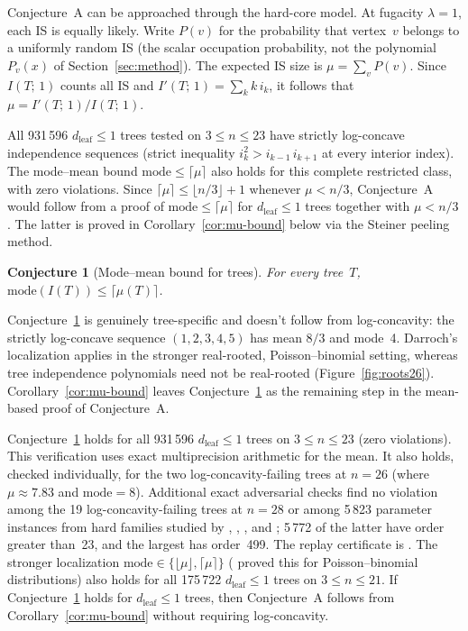 \documentclass[12pt,oneside]{article}
\newtheorem{conjecture}[theorem]{Conjecture}
\theoremstyle{remark}
\newcommand{\dleaf}{d_{\mathrm{leaf}}}    %
\begin{document}
Conjecture~A can be approached through the hard-core model.
At fugacity $\lambda = 1$, each IS is equally likely.
Write $P(v)$ for the probability that vertex~$v$ belongs to a uniformly random IS (the scalar occupation probability, not the polynomial~$P_v(x)$ of Section~\ref{sec:method}).
The expected IS size is $\mu = \sum_v P(v)$.
Since $I(T;\, 1)$ counts all IS and $I'(T;\, 1) = \sum_k k\, i_k$, it follows that $\mu = I'(T;\, 1) / I(T;\, 1)$.

All 931\,596 $\dleaf \le 1$ trees tested on $3\le n\le23$ have strictly log-concave independence sequences (strict inequality $i_k^2 > i_{k-1}\, i_{k+1}$ at every interior index).
The mode--mean bound $\mathrm{mode} \le \lceil\mu\rceil$ also holds for this complete restricted class, with zero violations.
Since $\lceil \mu \rceil \le \lfloor n/3 \rfloor + 1$ whenever $\mu < n/3$, Conjecture~A would follow from a proof of $\mathrm{mode} \le \lceil\mu\rceil$ for $\dleaf \le 1$ trees together with $\mu < n/3$.
The latter is proved in Corollary~\ref{cor:mu-bound} below via the Steiner peeling method.

\begin{conjecture}[Mode--mean bound for trees]\label{conj:mode-mean}
  For every tree~$T$, $\mathrm{mode}(I(T)) \le \lceil \mu(T) \rceil$.
\end{conjecture}

Conjecture~\ref{conj:mode-mean} is genuinely tree-specific and doesn't follow from log-concavity: the strictly log-concave sequence $(1,2,3,4,5)$ has mean $8/3$ and mode~4.
Darroch's localization applies in the stronger real-rooted, Poisson--binomial setting, whereas tree independence polynomials need not be real-rooted (Figure~\ref{fig:roots26}).
Corollary~\ref{cor:mu-bound} leaves Conjecture~\ref{conj:mode-mean} as the remaining step in the mean-based proof of Conjecture~A.

Conjecture~\ref{conj:mode-mean} holds for all 931\,596 $\dleaf\le1$ trees on $3\le n\le23$ (zero violations). This verification uses exact multiprecision arithmetic for the mean. It also holds, checked individually, for the two log-concavity-failing trees at $n = 26$ (where $\mu \approx 7.83$ and $\mathrm{mode} = 8$).
Additional exact adversarial checks find no violation among the 19 log-concavity-failing trees at $n=28$ or among 5\,823 parameter instances from hard families studied by \textcite{galvin2025}, \textcite{bautistaramos2025}, \textcite{li2025spiders}, and \textcite{li2026unimodality}; 5\,772 of the latter have order greater than~23, and the largest has order~499.
The replay certificate is .
The stronger localization $\mathrm{mode} \in \{\lfloor\mu\rfloor, \lceil\mu\rceil\}$ (\textcite{darroch1964} proved this for Poisson--binomial distributions) also holds for all 175\,722 $\dleaf \le 1$ trees on $3\le n\le21$.
If Conjecture~\ref{conj:mode-mean} holds for $\dleaf \le 1$ trees, then Conjecture~A follows from Corollary~\ref{cor:mu-bound} without requiring log-concavity.
\end{document}
